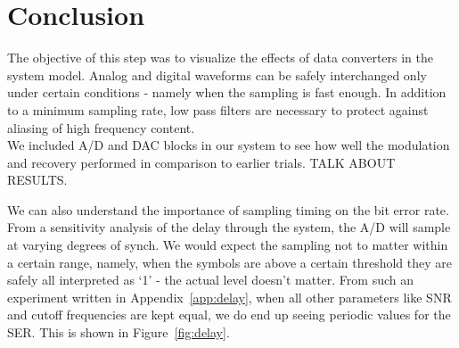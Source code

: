 \documentclass[]{article}
\begin{document}
%
%
%



\newpage
\section{Conclusion}
\label{sec:conc}

The objective of this step was to visualize the effects of data converters in the system model.  Analog and digital waveforms can be safely interchanged only under certain conditions - namely when the sampling is fast enough.  In addition to a minimum sampling rate, low pass filters are necessary to protect against aliasing of high frequency content.  \\

We included A/D and DAC blocks in our system to see how well the modulation and recovery performed in comparison to earlier trials.  TALK ABOUT RESULTS.

We can also understand the importance of sampling timing on the bit error rate.  From a sensitivity analysis of the delay through the system, the A/D will sample at varying degrees of synch.  We would expect the sampling not to matter within a certain range, namely, when the symbols are above a certain threshold they are safely all interpreted as `1' - the actual level doesn't matter.  From such an experiment written in Appendix~\ref{app:delay}, when all other parameters like SNR and cutoff frequencies are kept equal, we do end up seeing periodic values for the SER.  This is shown in Figure~\ref{fig:delay}.\\
\end{document}
